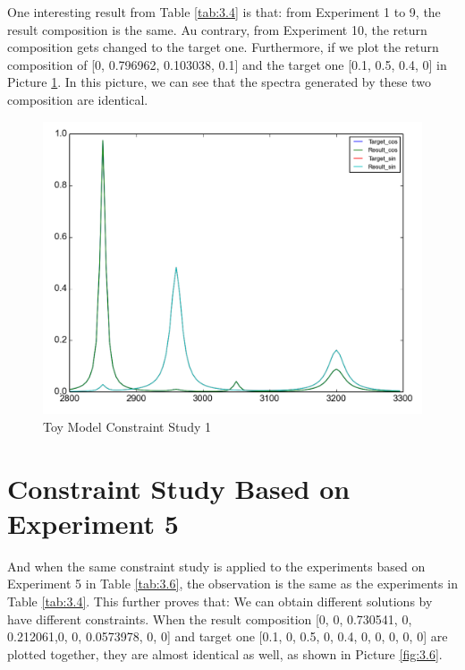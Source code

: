 One interesting result from Table \ref{tab:3.4} is that: from Experiment 1 to 9, the result composition is the same. Au contrary, from Experiment 10, the return composition gets changed to the target one. Furthermore, if we plot the return composition of [0, 0.796962, 0.103038, 0.1] and the target one [0.1, 0.5, 0.4, 0] in  Picture \ref{fig:3.5}. In this picture, we can see that the spectra generated by these two composition are identical.

\begin{figure}[!ht] \label{fig:3.5}
\centering
\includegraphics[scale=0.3]{Figures/toy_model_result_plotting_ir_sin_4candi_constraint_study_experiment4.png} 
\caption{Toy Model Constraint Study 1}
\end{figure}


\section{Constraint Study Based on Experiment 5}

And when the same constraint study is applied to the experiments based on Experiment 5 in Table \ref{tab:3.6}, the observation is the same as the experiments in Table \ref{tab:3.4}. This further proves that: We can obtain different solutions by have different constraints. When the  result composition [0, 0, 0.730541, 0, 0.212061,0, 0, 0.0573978, 0, 0] and target one [0.1, 0, 0.5, 0, 0.4, 0, 0, 0, 0, 0] are plotted together, they are almost identical as well, as shown in Picture \ref{fig:3.6}.

